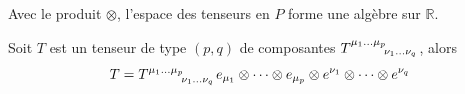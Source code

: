 \documentclass[a4paper,11pt]{report}
\begin{document}
                Avec le produit $\otimes$, l'espace des tenseurs en $P$ forme une algèbre sur $\mathbb{R}$.
                
                \begin{prop}\begin{leftbar}
                    Soit $T$ est un tenseur de type $(p,q)$ de composantes $T\indices{^{\mu_1\dots\mu_p}_{\nu_1\dots\nu_q}}$, alors
                    \begin{equation}
                        T = T\indices{^{\mu_1\dots\mu_p}_{\nu_1\dots\nu_q}} e_{\mu_1}\otimes\dots\otimes e_{\mu_p}\otimes e^{\nu_1}\otimes\dots\otimes e^{\nu_q}
                    \end{equation}
                \end{leftbar}\end{prop}
                
\end{document}
